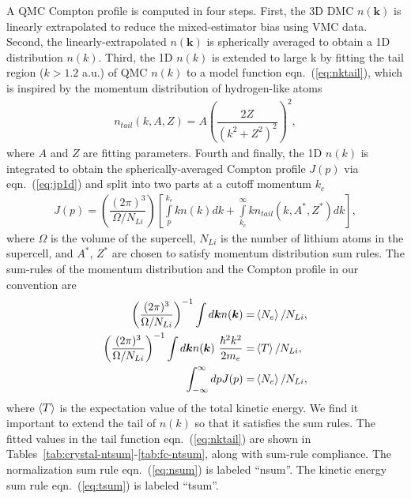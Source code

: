 \documentclass[aps,prl,superscriptaddress]{revtex4-1}
\newcommand{\bs}{\boldsymbol}
\begin{document}
A QMC Compton profile is computed in four steps. First, the 3D DMC $n(\bs{k})$ is linearly extrapolated to reduce the mixed-estimator bias using VMC data. Second, the linearly-extrapolated $n(\bs{k})$ is spherically averaged to obtain a 1D distribution $n(k)$. Third, the 1D $n(k)$ is extended to large k by fitting the tail region ($k > 1.2$ a.u.) of QMC $n(k)$ to a model function eqn.~(\ref{eq:nktail}), which is inspired by the momentum distribution of hydrogen-like atoms
\begin{align} \label{eq:nktail}
n_{tail}(k, A, Z) = A\left(\dfrac{2Z}{(k^2+Z^2)^2}\right)^2,
\end{align}
where $A$ and $Z$ are fitting parameters. Fourth and finally, the 1D $n(k)$ is integrated to obtain the spherically-averaged Compton profile $J(p)$ via eqn.~(\ref{eq:jp1d}) and split into two parts at a cutoff momentum $k_c$
\begin{align} \label{eq:jp1d}
J(p) = \left( \dfrac{(2\pi)^3}{\Omega/N_{Li}} \right)\left[
\int\limits_p^{k_c} k n(k) dk + \int\limits_{k_c}^{\infty} k n_{tail}(k, A^*, Z^*) dk
\right],
\end{align}
where $\Omega$ is the volume of the supercell, $N_{Li}$ is the number of lithium atoms in the supercell, and $A^*$, $Z^*$ are chosen to satisfy momentum distribution sum rules. %
The sum-rules of the momentum distribution and the Compton profile in our convention are
\begin{align}
\left( \dfrac{(2\pi)^3}{\Omega/N_{Li}} \right)^{-1} \int d\bs{k} n(\bs{k}) =& \braket{N_e}/N_{Li}, \label{eq:nsum} \\
\left( \dfrac{(2\pi)^3}{\Omega/N_{Li}} \right)^{-1} \int d\bs{k} n(\bs{k})~\frac{\hbar^2k^2}{2m_e} =& \braket{T}/N_{Li}, \label{eq:tsum} \\
\int_{-\infty}^{\infty} dp J(p) =& \braket{N_e}/N_{Li}, \label{eq:jpsum}
\end{align}
where $\braket{T}$ is the expectation value of the total kinetic energy. We find it important to extend the tail of $n(k)$ so that it satisfies the sum rules. The fitted values in the tail function eqn.~(\ref{eq:nktail}) are shown in Tables~\ref{tab:crystal-ntsum}-\ref{tab:fc-ntsum}, along with sum-rule compliance. The normalization sum rule eqn.~(\ref{eq:nsum}) is labeled ``nsum''. The kinetic energy sum rule eqn.~(\ref{eq:tsum}) is labeled ``tsum''.
\end{document}

